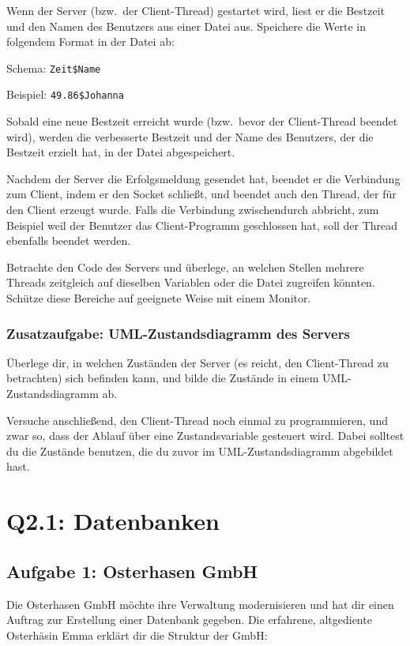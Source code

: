 Wenn der Server (bzw.\ der Client-Thread) gestartet wird, liest er die Bestzeit
und den Namen des Benutzers aus einer Datei aus. Speichere die Werte in
folgendem Format in der Datei ab:

Schema: \lstinline|Zeit$Name|	

Beispiel: \lstinline|49.86$Johanna|

Sobald eine neue Bestzeit erreicht wurde (bzw.\ bevor der Client-Thread beendet
wird), werden die verbesserte Bestzeit und der Name des Benutzers, der die
Bestzeit erzielt hat, in der Datei abgespeichert.

Nachdem der Server die Erfolgsmeldung gesendet hat, beendet er die Verbindung
zum Client, indem er den Socket schließt, und beendet auch den Thread, der für
den Client erzeugt wurde. Falls die Verbindung zwischendurch abbricht, zum
Beispiel weil der Benutzer das Client-Programm geschlossen hat, soll der Thread
ebenfalls beendet werden.

Betrachte den Code des Servers und überlege, an welchen Stellen mehrere Threads
zeitgleich auf dieselben Variablen oder die Datei zugreifen könnten. Schütze
diese Bereiche auf geeignete Weise mit einem Monitor.

\subsubsection{Zusatzaufgabe: UML-Zustandsdiagramm des Servers}

Überlege dir, in welchen Zuständen der Server (es reicht, den Client-Thread zu
betrachten) sich befinden kann, und bilde die Zustände in einem
UML-Zustandsdiagramm ab.

Versuche anschließend, den Client-Thread noch einmal zu programmieren, und zwar
so, dass der Ablauf über eine Zustandsvariable gesteuert wird. Dabei solltest du
die Zustände benutzen, die du zuvor im UML-Zustandsdiagramm abgebildet hast.


\section{Q2.1: Datenbanken}

\subsection{Aufgabe 1: Osterhasen GmbH}

Die Osterhasen GmbH möchte ihre Verwaltung modernisieren und hat dir einen
Auftrag zur Erstellung einer Datenbank gegeben. Die erfahrene, altgediente
Osterhäsin Emma erklärt dir die Struktur der GmbH:

